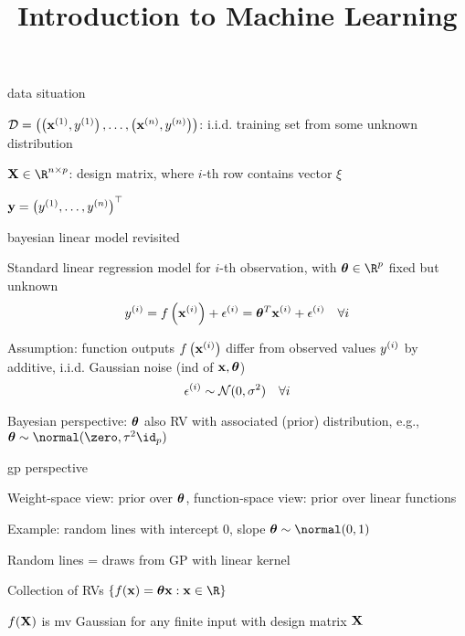 \documentclass[11pt,compress,t,notes=noshow, xcolor=table]{beamer}
\title{Introduction to Machine Learning}
\begin{document}
\newcommand{\nzk}{\normal(\zero, \Kmat)}
\newcommand{\kxxt}{k(\xv, \xtil)}
\newcommand{\xxtnorm}{\| \xv - \xtil\|}
\newcommand{\Xsubset}{\bm{X}}
\newcommand{\fX}{f(\Xsubset)}
\newcommand{\kXX}{k(\Xsubset, \Xsubset)}
\newcommand{\mX}{m(\Xsubset)}
\newcommand{\gpmk}{\mathcal{GP}(m(\cdot), k(\cdot, \cdot))}
\newcommand{\gpzk}{\mathcal{GP}(\zero, k(\cdot, \cdot))}



\begin{framei}{data situation}
\item $\mathcal{D} = \left( \left(\mathbf{x}^{(1)}, y^{(1)}\right), \ldots, \left(\mathbf{x}^{(n)}, y^{(n)}\right)\right)$: i.i.d. training set from some unknown distribution
\item $\Xmat \in \R^{n \times p}$: design matrix, where $i$-th row contains vector $\xi$
\item $\mathbf{y} = \left(y^{(1)}, \hdots, y^{(n)}\right)^\top$
\end{framei}

\begin{framei}[sep=L]{bayesian linear model revisited}
\item Standard linear regression model for $i$-th observation, with $\thetav \in \R^p$ fixed but unknown
$$y^{(i)} = f\left(\mathbf{x}^{(i)}\right) + \epsilon^{(i)} = \bm{\theta}^T \mathbf{x}^{(i)} + \epsilon^{(i)} \quad \forall i$$
\item Assumption: function outputs $f\left(\mathbf{x}^{(i)}\right)$ differ from observed values $y^{(i)}$ by additive, i.i.d. Gaussian noise (ind of $\mathbf{x}, \bm{\theta}$)
$$\epsilon^{(i)} \sim \mathcal{N}(0, \sigma^2) \quad \forall i$$ 
\item Bayesian perspective: $\bm{\theta}$ also RV with associated (prior) distribution, e.g., $\thetav \sim \normal(\zero, \tau^2 \id_p)$
\end{framei}

\begin{framei}{gp perspective}
\item Weight-space view: prior over $\bm{\theta}$, function-space view: prior over linear functions
\item Example: random lines with intercept 0, slope $\thetav \sim \normal(0, 1)$
\vfill
\item Random lines = draws from GP with linear kernel
\item Collection of RVs $\{ \fx = \thetav \xv: \xv \in \R\}$\item $f(\mathbf{X})$ is mv Gaussian for any finite input with design matrix $\mathbf{X}$
\end{framei}
\end{document}
